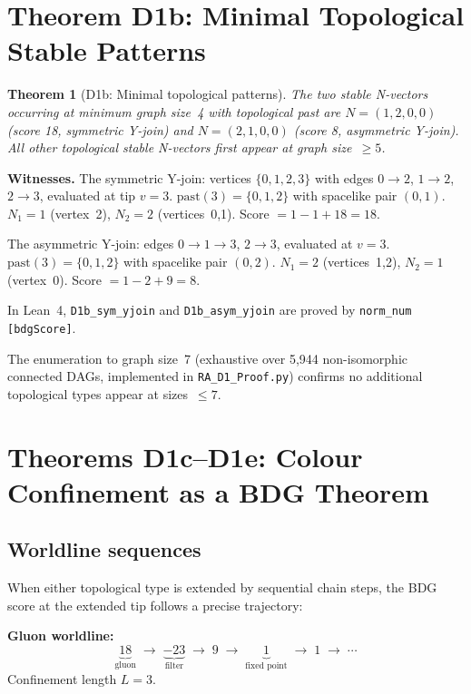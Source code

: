 \documentclass[11pt,a4paper]{article}
\newtheorem{theorem}{Theorem}[section]
\begin{document}
\section{Theorem D1b: Minimal Topological Stable Patterns}
\label{sec:D1b}

\begin{theorem}[D1b: Minimal topological patterns]
\label{thm:D1b}
The two stable N-vectors occurring at minimum graph size~4 with
topological past are $N=(1,2,0,0)$ (score 18, symmetric Y-join)
and $N=(2,1,0,0)$ (score 8, asymmetric Y-join). All other topological
stable N-vectors first appear at graph size~$\geq 5$.
\end{theorem}

\noindent\textbf{Witnesses.}
The symmetric Y-join: vertices $\{0,1,2,3\}$ with edges
$0{\to}2$, $1{\to}2$, $2{\to}3$, evaluated at tip $v=3$.
$\mathrm{past}(3) = \{0,1,2\}$ with spacelike pair $(0,1)$.
$N_1=1$ (vertex~2), $N_2=2$ (vertices~0,1). Score $= 1-1+18 = 18$.

The asymmetric Y-join: edges $0{\to}1{\to}3$, $2{\to}3$, evaluated at $v=3$.
$\mathrm{past}(3) = \{0,1,2\}$ with spacelike pair $(0,2)$.
$N_1=2$ (vertices~1,2), $N_2=1$ (vertex~0). Score $= 1-2+9 = 8$.

In Lean~4, \texttt{D1b\_sym\_yjoin} and \texttt{D1b\_asym\_yjoin} are
proved by \texttt{norm\_num [bdgScore]}.

The enumeration to graph size~7 (exhaustive over 5,944 non-isomorphic
connected DAGs, implemented in \texttt{RA\_D1\_Proof.py}) confirms no
additional topological types appear at sizes~$\leq 7$.

\section{Theorems D1c--D1e: Colour Confinement as a BDG Theorem}
\label{sec:confinement}

\subsection{Worldline sequences}

When either topological type is extended by sequential chain steps,
the BDG score at the extended tip follows a precise trajectory:

\medskip
\noindent\textbf{Gluon worldline:}
\[
  \underbrace{18}_{\text{gluon}} \;\to\;
  \underbrace{-23}_{\text{filter}} \;\to\;
  9 \;\to\; \underbrace{1}_{\text{fixed point}} \;\to\; 1 \;\to\; \cdots
\]
Confinement length $L = 3$.
\end{document}
